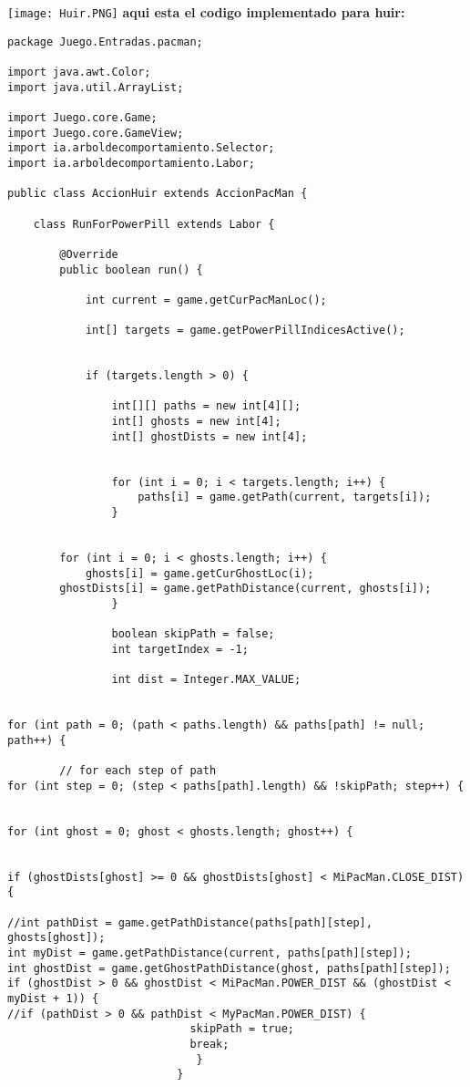 \documentclass[11pt]{article}
\begin{document}
\texttt{[image: Huir.PNG]} 
\linebreak
\textbf{aqui esta el codigo implementado para huir:}\\
\linebreak
\lstset{language=java, breaklines=true, basicstyle=\footnotesize}
\begin{lstlisting}[frame=single]
package Juego.Entradas.pacman;

import java.awt.Color;
import java.util.ArrayList;

import Juego.core.Game;
import Juego.core.GameView;
import ia.arboldecomportamiento.Selector;
import ia.arboldecomportamiento.Labor;

public class AccionHuir extends AccionPacMan {
	
	class RunForPowerPill extends Labor {

		@Override
		public boolean run() {
			
			int current = game.getCurPacManLoc();
			
			int[] targets = game.getPowerPillIndicesActive();
			
			
			if (targets.length > 0) {
				
				int[][] paths = new int[4][];
				int[] ghosts = new int[4];
				int[] ghostDists = new int[4];
				
			
				for (int i = 0; i < targets.length; i++) {
					paths[i] = game.getPath(current, targets[i]);
				}
				
				
		for (int i = 0; i < ghosts.length; i++) {
			ghosts[i] = game.getCurGhostLoc(i);
		ghostDists[i] = game.getPathDistance(current, ghosts[i]);
				}
				
				boolean skipPath = false;
				int targetIndex = -1;
				
				int dist = Integer.MAX_VALUE;
				
				
for (int path = 0; (path < paths.length) && paths[path] != null; path++) {
									
		// for each step of path
for (int step = 0; (step < paths[path].length) && !skipPath; step++) {
						
						
for (int ghost = 0; ghost < ghosts.length; ghost++) {
							
							
if (ghostDists[ghost] >= 0 && ghostDists[ghost] < MiPacMan.CLOSE_DIST) {
								
//int pathDist = game.getPathDistance(paths[path][step], ghosts[ghost]);
int myDist = game.getPathDistance(current, paths[path][step]);
int ghostDist = game.getGhostPathDistance(ghost, paths[path][step]);
if (ghostDist > 0 && ghostDist < MiPacMan.POWER_DIST && (ghostDist < myDist + 1)) {
//if (pathDist > 0 && pathDist < MyPacMan.POWER_DIST) {
							skipPath = true;
							break;
				      	     } 
					      }
							

\end{lstlisting}
\end{document}

